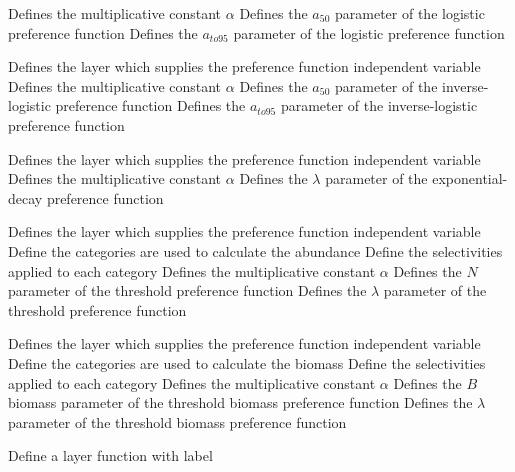  {Defines the multiplicative constant $\alpha$}
 {Defines the $a_{50}$ parameter of the logistic preference function}
 {Defines the $a_{to95}$ parameter of the logistic preference function}
\par\textbf{}\par
{} {Defines the layer which supplies the preference function independent variable}
 {Defines the multiplicative constant $\alpha$}
 {Defines the $a_{50}$ parameter of the inverse-logistic preference function}
 {Defines the $a_{to95}$ parameter of the inverse-logistic preference function}
\par\textbf{}\par
{} {Defines the layer which supplies the preference function independent variable}
 {Defines the multiplicative constant $\alpha$}
 {Defines the $\lambda$ parameter of the exponential-decay preference function}
\par\textbf{}\par
{} {Defines the layer which supplies the preference function independent variable}
 {Define the categories are used to calculate the abundance}
 {Define the selectivities applied to each category}
 {Defines the multiplicative constant $\alpha$}
 {Defines the $N$ parameter of the threshold preference function}
 {Defines the $\lambda$ parameter of the threshold preference function}
\par\textbf{}\par
{} {Defines the layer which supplies the preference function independent variable}
 {Define the categories are used to calculate the biomass}
 {Define the selectivities applied to each category}
 {Defines the multiplicative constant $\alpha$}
 {Defines the $B$ biomass parameter of the threshold biomass preference function}
 {Defines the $\lambda$ parameter of the threshold biomass preference function}
\par {} {Define a layer function with label}\par
